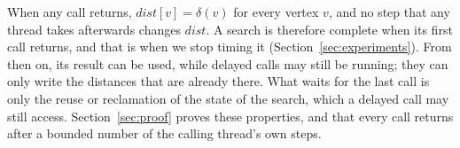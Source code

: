 When any call returns, $\mathit{dist}[v] = \delta(v)$ for every vertex $v$, and no step that any thread takes afterwards changes $\mathit{dist}$. A search is therefore complete when its first call returns, and that is when we stop timing it (Section~\ref{sec:experiments}). From then on, its result can be used, while delayed calls may still be running; they can only write the distances that are already there. What waits for the last call is only the reuse or reclamation of the state of the search, which a delayed call may still access. Section~\ref{sec:proof} proves these properties, and that every call returns after a bounded number of the calling thread's own steps.
